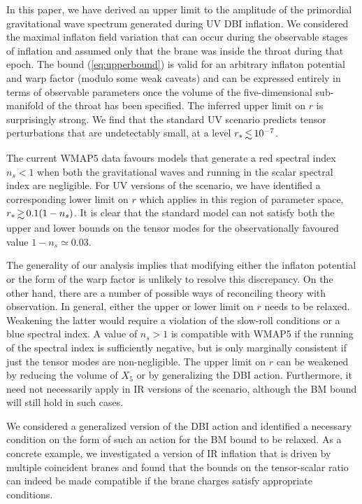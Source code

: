 In this paper, we have derived an upper limit to
the amplitude of the primordial gravitational wave spectrum
generated during UV DBI inflation. We considered   
the maximal inflaton field variation   
that can occur during the observable stages of inflation and assumed  
only that the brane was inside the throat during that epoch. 
The bound (\ref{eq:upperbound}) is valid for an arbitrary inflaton potential and 
warp factor (modulo some weak caveats) and can be expressed 
entirely in terms of observable parameters once the volume of 
the five-dimensional sub-manifold of the throat has been specified. 
The inferred upper limit on $r$ is surprisingly strong. 
We find that the standard UV  
scenario predicts tensor perturbations that are undetectably small, 
at a level ${r_*} \, {\lsim} \, {10^{-7}}$. 

The current WMAP5 data 
favours models that generate a red spectral index $n_s<1$
when both the gravitational waves and running in the scalar 
spectral index are negligible. For UV versions of the scenario, 
we have identified a corresponding 
lower limit on $r$ which applies in this region of 
parameter space, $r_* \, \gsim \, 0.1 (1-n_s)$. It is clear that 
the standard model 
can not satisfy both the upper and lower bounds 
on the tensor modes for the observationally favoured value 
$1-n_s \simeq 0.03$.


The generality of our 
analysis implies that modifying either the inflaton potential 
or the form of the warp factor is unlikely to resolve this discrepancy. 
On the other hand, there are a number of possible ways of reconciling  
theory with observation. In general, 
either the upper or lower limit on $r$ needs to be relaxed. 
Weakening the latter would require a violation of the slow-roll 
conditions or a blue spectral index. 
A value of $n_s >1$ is compatible with WMAP5 if the running of the 
spectral index 
is sufficiently negative, but is only marginally
consistent if just the tensor modes are non-negligible.  The 
upper limit on $r$ can be weakened by reducing 
the volume of $X_5$ or 
by generalizing the DBI action. Furthermore, it need not necessarily 
apply in IR versions of the scenario, although the BM bound will still hold
in such cases. 


We considered a generalized version of the 
DBI action and identified a necessary condition on the form of such  
an action for the BM bound to be relaxed.
As a concrete example, 
we investigated a version of IR inflation that is driven by 
multiple coincident branes and found that  
the bounds on the tensor-scalar ratio can indeed 
be made compatible if the brane charges satisfy appropriate 
conditions.   


